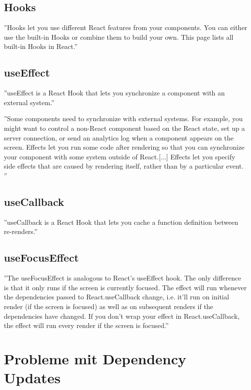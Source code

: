 \subsection{Hooks}\label{subsec:hooks}
''Hooks let you use different React features from your components.
You can either use the built-in Hooks or combine them to build your own.
This page lists all built-in Hooks in React.''
\cite{hooks}

\subsection{useEffect}\label{subsec:useeffect}
''useEffect is a React Hook that lets you synchronize a component with an external system.''\cite{useEffect}

''Some components need to synchronize with external systems.
For example, you might want to control a non-React component based on the React state, set up a server connection,
or send an analytics log when a component appears on the screen.
Effects let you run some code after rendering so that you can synchronize your component with some system outside of React.[...]
Effects let you specify side effects that are caused by rendering itself,
rather than by a particular event. ''
\cite{Synchronizing-with-effects}




\subsection{useCallback}\label{subsec:usecallback}
''useCallback is a React Hook that lets you cache a function definition between re-renders.''
\cite{useCallback}


\subsection{useFocusEffect}\label{subsec:usefocuseffect}
''The useFocusEffect is analogous to React's useEffect hook. The only difference is that it only runs if the screen
is currently focused.
The effect will run whenever the dependencies passed to React.useCallback change,
i.e. it'll run on initial render (if the screen is focused) as well as on subsequent renders if the dependencies
have changed. If you don't wrap your effect in React.useCallback, the effect will run every render if the screen
is focused.'' \cite{useFocusEffect}


\section{Probleme mit Dependency Updates}


